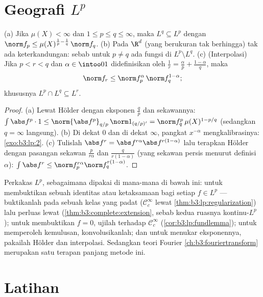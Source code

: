 \section{Geografi \texorpdfstring{$L^p$}{Lp}}

\begin{proposition}\label{prop:b3:lp:inclusions}
(a) Jika $\mu(X) < \infty$ dan $1 \leq p \leq q \leq \infty$,
maka $L^q \subseteq L^p$ dengan $\norm f_p \leq
\mu(X)^{\frac1p - \frac1q}\,\norm f_q$.
(b) Pada $\R^d$ (yang berukuran tak berhingga) tak ada keterkandungan:
sebab untuk $p \neq q$ ada fungsi di $L^p\setminus L^q$.
(c) (Interpolasi) Jika $p < r < q$ dan $\alpha \in \intoo01$
didefinisikan oleh $\frac1r = \frac\alpha p + \frac{1 - \alpha}q$,
maka
\[
\norm f_r \leq \norm f_p^{\alpha}\,\norm f_q^{1 - \alpha} ;
\]
khususnya $L^p \cap L^q \subseteq L^r$.
\end{proposition}

\begin{proof}
(a) Lewat Hölder dengan eksponen $\frac qp$ dan sekawannya:
$\int\abs f^p\cdot 1 \leq \norm{\abs f^p}_{q/p}\,\norm
1_{(q/p)'} = \norm f_q^p\,\mu(X)^{1 - p/q}$ (sedangkan $q = \infty$
langsung). (b) Di dekat $0$ dan di dekat $\infty$, pangkat $x^{-\alpha}$
mengkalibrasinya: \cref{exo:b3:lp:2}. (c) Tulislah $\abs f^r = \abs
f^{r\alpha}\abs f^{r(1-\alpha)}$ lalu terapkan Hölder dengan
pasangan sekawan $\frac p{r\alpha}$ dan $\frac q{r(1-\alpha)}$
(yang sekawan persis menurut definisi $\alpha$):
$\int\abs f^r \leq \norm f_p^{r\alpha}\norm f_q^{r(1 -
\alpha)}$.
\end{proof}

\begin{method}\label{met:b3:lp:toolkit}
Perkakas $L^p$, sebagaimana dipakai di mana-mana di bawah ini: untuk membuktikan sebuah
identitas atau ketaksamaan bagi setiap $f \in L^p$ --- buktikanlah pada sebuah
kelas yang padat ($\mathcal C_c^\infty$ lewat
\cref{thm:b3:lp:regularization}) lalu perluas lewat 
(\cref{thm:b3:complete:extension}, sebab kedua ruasnya
kontinu-$L^p$); untuk membuktikan $f = 0$, ujilah terhadap $\mathcal
C_c^\infty$ (\cref{cor:b3:lp:fundlemma}); untuk memperoleh kemulusan,
konvolusikanlah; dan untuk menukar eksponennya, pakailah Hölder dan interpolasi. Sedangkan
teori Fourier \cref{ch:b3:fouriertransform} merupakan satu terapan panjang
metode ini.
\end{method}

\section{Latihan}

